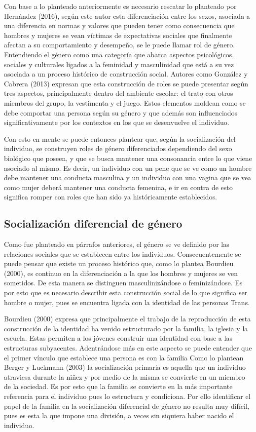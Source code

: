 Con base a lo planteado anteriormente es necesario rescatar lo planteado por
Hernández (2016), según este autor esta diferenciación entre los sexos, asociada
a una diferencia en normas y valores que pueden tener como consecuencia que
hombres y mujeres se vean víctimas de expectativas sociales que finalmente
afectan a su comportamiento y desempeño, se le puede llamar rol de género.
Entendiendo el género como una categoría que abarca aspectos psicológicos,
sociales y culturales ligados a la feminidad y masculinidad que está a su vez
asociada a un proceso histórico de construcción social.
Autores como González y Cabrera (2013) expresan que esta construcción de roles
se puede presentar según tres aspectos, principalmente dentro del ambiente
escolar: el trato con otros miembros del grupo, la vestimenta y el juego.
Estos elementos moldean como se debe comportar una persona según su género y que
además son influenciados significativamente por los contextos en los que se
desenvuelve el individuo.

Con esto en mente se puede entonces plantear que, según la socialización del
individuo, se construyen roles de género diferenciados dependiendo del sexo
biológico que poseen, y que se busca mantener una consonancia entre lo que viene
asociado al mismo.
Es decir, un individuo con un pene que se ve como un hombre debe mantener una
conducta masculina y un individuo con una vagina que se vea como mujer deberá
mantener una conducta femenina, e ir en contra de esto significa romper con
roles que han sido ya históricamente establecidos.

\subsection{Socialización diferencial de género}
Como fue planteado en párrafos anteriores, el género se ve definido por las
relaciones sociales que se establecen entre los individuos.
Consecuentemente se puede pensar que existe un proceso histórico que, como lo
plantea Bourdieu (2000), es continuo en la diferenciación a la que los
hombres y mujeres se ven sometidos.
De esta manera se distinguen masculinizándose o feminizándose.
Es por esto que es necesario describir esta construcción social de lo que
significa ser hombre o mujer, pues se encuentra ligada con la identidad de las
personas Trans.

Bourdieu (2000) expresa que principalmente el trabajo de la reproducción de esta
construcción de la identidad ha venido estructurado por la familia, la iglesia y
la escuela.
Estas permiten a los jóvenes construir una identidad con base a las estructuras
subyacentes.
Adentrándose más en este aspecto se puede entender que el primer vínculo que
establece una persona es con la familia
Como lo plantean Berger y Luckmann (2003) la socialización primaria es
aquella que un individuo atraviesa durante la niñez y por medio de la misma
se convierte en un miembro de la sociedad.
Es por esto que la familia se convierte en la más importante referencia para el
individuo pues lo estructura y condiciona.
Por ello identificar el papel de la familia en la socialización diferencial de
género no resulta muy difícil, pues es esta la que impone una división, a veces
sin siquiera haber nacido el individuo.

